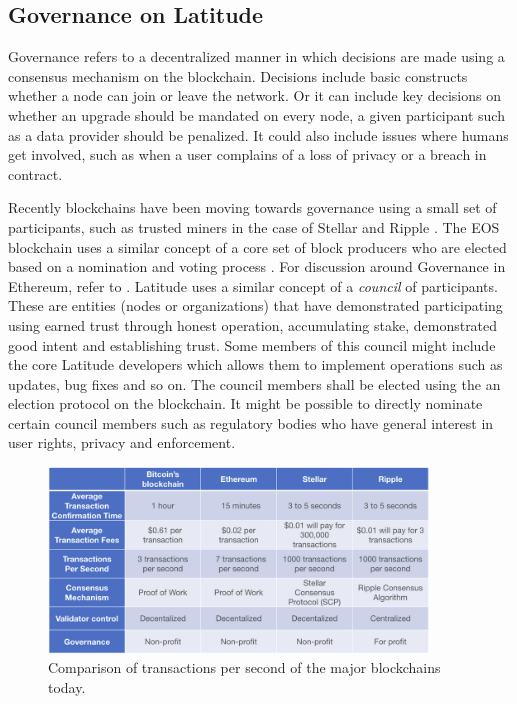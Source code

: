 \subsection{Governance on Latitude}

Governance refers to a decentralized manner in which decisions are made using a consensus mechanism on the blockchain.
Decisions include basic constructs whether a node can join or leave the network. Or it can include key decisions on
whether an upgrade should be mandated on every node, a given participant such as a data provider should be penalized. It
could also include issues where humans get involved, such as when a user complains of a loss of privacy or a breach in
contract.

Recently blockchains have been moving towards governance using a small set of participants, such as trusted miners in
the case of Stellar and Ripple \cite{stellar_gateway}. The EOS blockchain uses a similar concept of a core set of block
producers who are elected based on a nomination and voting process \cite{eos_producers}. For discussion around
Governance in Ethereum, refer to \cite{buterin_gov}. Latitude uses a similar concept of a {\em council} of participants.
These are entities (nodes or organizations) that have demonstrated participating using earned trust through honest
operation, accumulating stake, demonstrated good intent and establishing trust. Some members of this council might
include the core Latitude developers which allows them to implement operations such as updates, bug fixes and so on. The
council members shall be elected using the an election protocol on the blockchain. It might be possible to directly
nominate certain council members such as regulatory bodies who have general interest in user rights, privacy and
enforcement. 

%

\begin{figure}[t]
    \centering
    \includegraphics[width=0.90\textwidth]{tps_speed2.png}
  \caption{Comparison of transactions per second of the major blockchains today.}
    \label{fig:tps_speed}
\end{figure}

